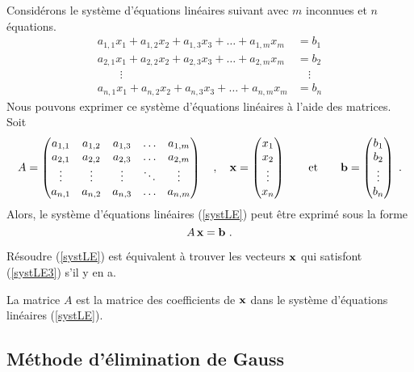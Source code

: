 {Considérons le système d'équations linéaires suivant avec $m$
inconnues et $n$ équations.
\begin{equation} \label{systLE}
\begin{split}
a_{1,1} x_1 + a_{1,2} x_2 + a_{1,3} x_3 + \ldots + a_{1,m} x_m &= b_1 \\
a_{2,1} x_1 + a_{2,2} x_2 + a_{2,3} x_3 + \ldots + a_{2,m} x_m &= b_2 \\
\qquad \vdots \qquad & \quad \vdots \\
a_{n,1} x_1 + a_{n,2} x_2 + a_{n,3} x_3 + \ldots + a_{n,m} x_m &= b_n
\end{split}
\end{equation}
Nous pouvons exprimer ce système d'équations linéaires à l'aide des
matrices.  Soit
\[
A=\begin{pmatrix}
a_{1,1} & a_{1,2} & a_{1,3} & \ldots & a_{1,m} \\
a_{2,1} & a_{2,2} & a_{2,3} & \ldots & a_{2,m} \\
\vdots & \vdots & \vdots & \ddots & \vdots \\
a_{n,1} & a_{n,2} & a_{n,3} & \ldots & a_{n,m}
\end{pmatrix}
\quad , \quad
\mathbf{x} =
\begin{pmatrix}
x_1 \\ x_2 \\ \vdots \\ x_n
\end{pmatrix}
\qquad \text{et} \qquad
\mathbf{b} =
\begin{pmatrix}
b_1 \\ b_2 \\ \vdots \\ b_n
\end{pmatrix} \; .
\]
Alors, le système d'équations linéaires (\ref{systLE}) peut être
exprimé sous la forme
\begin{equation}\label{systLE3}
A\,\mathbf{x} = \mathbf{b} \ .
\end{equation}

\begin{prop}
Résoudre (\ref{systLE}) est équivalent à trouver les vecteurs
$\mathbf{x}$ qui satisfont (\ref{systLE3}) s'il y en a.
\end{prop}

La matrice $A$ est la matrice des coefficients de $\mathbf{x}$ dans le
système d'équations linéaires (\ref{systLE}).

\subsection{Méthode d'élimination de Gauss}

}
